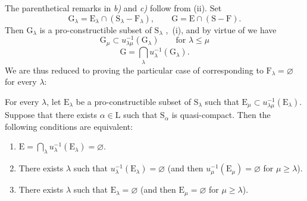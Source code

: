 \begin{theorem}[8.3.2]
The parenthetical remarks in \emph{b)} and \emph{c)} follow from (ii).
Set
\[
  \mathrm{G}_\lambda=\mathrm{E}_\lambda\cap(\mathrm{S}_\lambda-\mathrm{F}_\lambda),\qquad \mathrm{G}=\mathrm{E}\cap(\mathrm{S}-\mathrm{F}).
\]
Then $\mathrm{G}_\lambda$ is a pro-constructible subset of $\mathrm{S}_\lambda$ ,~(i), and by virtue of  we have
\[
  \mathrm{G}_\mu\subset u_{\lambda\mu}^{-1}(\mathrm{G}_\lambda)\qquad\text{for }\lambda\leqslant\mu
\]
\[
  \mathrm{G}=\bigcap_\lambda u_\lambda^{-1}(\mathrm{G}_\lambda).
\]
We are thus reduced to proving the particular case of  corresponding to $\mathrm{F}_\lambda=\varnothing$ for every $\lambda$:
\end{theorem}

\begin{corollary}[8.3.3]
\label{IV.8.3.3}
For every $\lambda$, let $\mathrm{E}_\lambda$ be a pro-constructible subset of $\mathrm{S}_\lambda$ such that $\mathrm{E}_\mu\subset u_{\lambda\mu}^{-1}(\mathrm{E}_\lambda)$.
Suppose that there exists $\alpha\in\mathrm{L}$ such that $\mathrm{S}_\alpha$ is quasi-compact.
Then the following conditions are equivalent:
\begin{enumerate}[label=\emph{\alph*)}]
  \item $\mathrm{E}=\bigcap_\lambda u_\lambda^{-1}(\mathrm{E}_\lambda)=\varnothing$.
  \item There exists $\lambda$ such that $u_\lambda^{-1}(\mathrm{E}_\lambda)=\varnothing$ (and then $u_\mu^{-1}(\mathrm{E}_\mu)=\varnothing$ for $\mu\geqslant\lambda$).
  \item There exists $\lambda$ such that $\mathrm{E}_\lambda=\varnothing$ (and then $\mathrm{E}_\mu=\varnothing$ for $\mu\geqslant\lambda$).
\end{enumerate}
\end{corollary}

